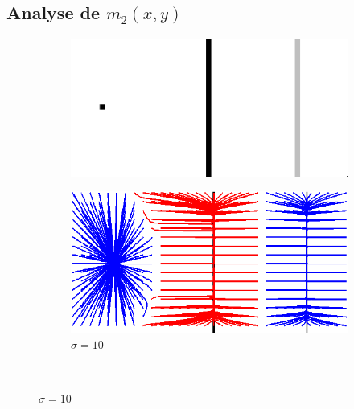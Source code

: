 \subsection{Analyse de $m_2(x,y)$}
\begin{figure}[!h]
   \begin{subfigure}[c]{.5\linewidth}
     \centering
     \includegraphics[width=\textwidth]{Chapters/Images/synthetic_map.png}
     \caption{}
   \end{subfigure} 
      \begin{subfigure}[c]{.5\linewidth}
     \centering
     \includegraphics[width=\textwidth]{Chapters/Images/m2_sigma_10.png}
     \caption{$\sigma=10$}
   \end{subfigure} \\
   

\end{figure}
